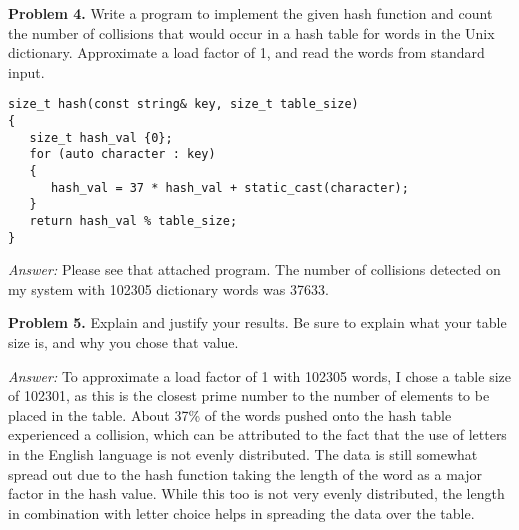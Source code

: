 \documentclass[11pt]{article}
\begin{document}
\begin{center}
\end{center}

\textbf{Problem 4.} Write a program to implement the given hash function and 
count the number of collisions that would occur in a hash table for words 
in the Unix dictionary. Approximate a load factor of 1, and read the words 
from standard input.

\begin{Verbatim}[xleftmargin=5mm]
size_t hash(const string& key, size_t table_size)
{
   size_t hash_val {0};
   for (auto character : key)
   {
      hash_val = 37 * hash_val + static_cast(character);
   }
   return hash_val % table_size;
}
\end{Verbatim}

\textit{Answer:} Please see that attached program. The number of collisions 
detected on my system with 102305 dictionary words was 37633.

\textbf{Problem 5.} Explain and justify your results. Be sure to explain what 
your table size is, and why you chose that value.

\textit{Answer:} To approximate a load factor of 1 with 102305 words, I chose 
a table size of 102301, as this is the closest prime number to the number of 
elements to be placed in the table. About 37\% of the words pushed onto 
the hash table experienced a collision, which can be attributed to the fact 
that the use of letters in the English language is not evenly distributed. 
The data is still somewhat spread out due to the hash function taking the 
length of the word as a major factor in the hash value. While this too is 
not very evenly distributed, the length in combination with letter choice 
helps in spreading the data over the table.
\end{document}
